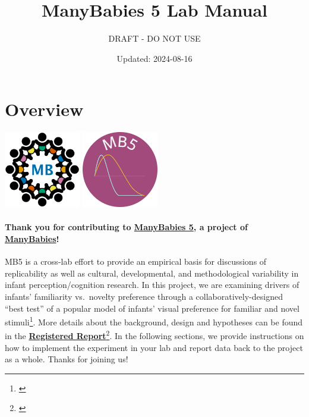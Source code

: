 \documentclass[
]{book}
\title{ManyBabies 5 Lab Manual}
\subtitle{DRAFT - DO NOT USE}
\author{}
\date{\vspace{-2.5em}Updated: 2024-08-16}
\begin{document}
\maketitle

{
\setcounter{tocdepth}{1}
\tableofcontents
}
\chapter*{Overview}\label{overview}

\includegraphics[width=0.25\textwidth,height=\textheight]{images/mb-logo.png} \includegraphics[width=0.25\textwidth,height=\textheight]{images/mb5-logo.png}

\subsubsection*{\texorpdfstring{Thank you for contributing to \href{https://manybabies.org/MB5/}{\textbf{ManyBabies 5}}, a project of \href{https://manybabies.org/}{\textbf{ManyBabies}}!}{Thank you for contributing to ManyBabies 5, a project of ManyBabies!}}\label{thank-you-for-contributing-to-manybabies-5-a-project-of-manybabies}

MB5 is a cross-lab effort to provide an empirical basis for discussions of replicability as well as cultural, developmental, and methodological variability in infant perception/cognition research. In this project, we are examining drivers of infants' familiarity vs.~novelty preference through a collaboratively-designed ``best test'' of a popular model of infants' visual preference for familiar and novel stimuli\footnote{\citet{hunterames}}. More details about the background, design and hypotheses can be found in the \href{https://osf.io/preprints/psyarxiv/ck3vd}{\textbf{Registered Report}}\footnote{\citet{kosiezettersten2024}}. In the following sections, we provide instructions on how to implement the experiment in your lab and report data back to the project as a whole. Thanks for joining us!
\end{document}
